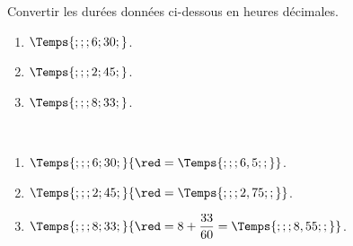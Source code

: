 \begin{exercice}
   Convertir les durées données ci-dessous en heures décimales.
   \begin{enumerate}
      \item $\Temps{;;;6;30;}$.
      \item $\Temps{;;;2;45;}$.
      \item $\Temps{;;;8;33;}$.
   \end{enumerate}
\end{exercice}

\begin{corrige}
   \ \\ [-5mm]
   \begin{enumerate}
      \item $\Temps{;;;6;30;}{\red = \Temps{;;;6,5;;}}$.
      \item $\Temps{;;;2;45;}{\red = \Temps{;;;2,75;;}}$.
      \item $\Temps{;;;8;33;}{\red = 8 + \dfrac{33}{60} = \Temps{;;;8,55;;}}$.
   \end{enumerate}
\end{corrige}